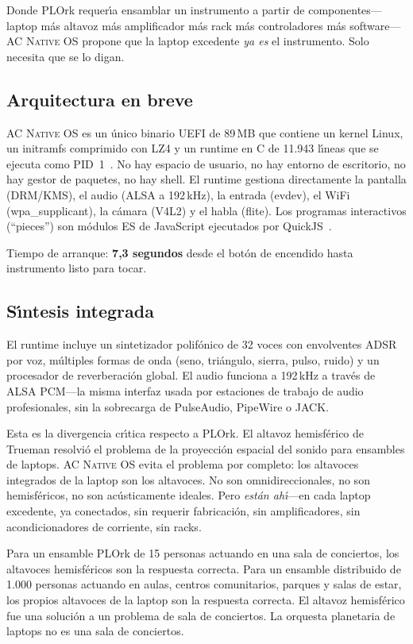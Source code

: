 \documentclass[10pt,letterpaper,twocolumn]{article}
\newcommand{\acos}{\textsc{AC Native OS}}
\begin{document}
Donde PLOrk requer\'{\i}a ensamblar un instrumento a partir de componentes---laptop m\'{a}s altavoz m\'{a}s amplificador m\'{a}s rack m\'{a}s controladores m\'{a}s software---\acos{} propone que la laptop excedente \emph{ya es} el instrumento. Solo necesita que se lo digan.

\subsection{Arquitectura en breve}

\acos{} es un \'{u}nico binario UEFI de 89\,MB que contiene un kernel Linux, un initramfs comprimido con LZ4 y un runtime en C de 11.943 l\'{\i}neas que se ejecuta como PID~1~\citep{scudder2026os}. No hay espacio de usuario, no hay entorno de escritorio, no hay gestor de paquetes, no hay shell. El runtime gestiona directamente la pantalla (DRM/KMS), el audio (ALSA a 192\,kHz), la entrada (evdev), el WiFi (wpa\_supplicant), la c\'{a}mara (V4L2) y el habla (flite). Los programas interactivos (``pieces'') son m\'{o}dulos ES de JavaScript ejecutados por QuickJS~\citep{bellard2019quickjs}.

Tiempo de arranque: \textbf{7,3 segundos} desde el bot\'{o}n de encendido hasta instrumento listo para tocar.

\subsection{S\'{\i}ntesis integrada}

El runtime incluye un sintetizador polif\'{o}nico de 32 voces con envolventes ADSR por voz, m\'{u}ltiples formas de onda (seno, tri\'{a}ngulo, sierra, pulso, ruido) y un procesador de reverberaci\'{o}n global. El audio funciona a 192\,kHz a trav\'{e}s de ALSA PCM---la misma interfaz usada por estaciones de trabajo de audio profesionales, sin la sobrecarga de PulseAudio, PipeWire o JACK.

Esta es la divergencia cr\'{\i}tica respecto a PLOrk. El altavoz hemisf\'{e}rico de Trueman resolvi\'{o} el problema de la proyecci\'{o}n espacial del sonido para ensambles de laptops. \acos{} evita el problema por completo: los altavoces integrados de la laptop son los altavoces. No son omnidireccionales, no son hemisf\'{e}ricos, no son ac\'{u}sticamente ideales. Pero \emph{est\'{a}n ah\'{\i}}---en cada laptop excedente, ya conectados, sin requerir fabricaci\'{o}n, sin amplificadores, sin acondicionadores de corriente, sin racks.

Para un ensamble PLOrk de 15 personas actuando en una sala de conciertos, los altavoces hemisf\'{e}ricos son la respuesta correcta. Para un ensamble distribuido de 1.000 personas actuando en aulas, centros comunitarios, parques y salas de estar, los propios altavoces de la laptop son la respuesta correcta. El altavoz hemisf\'{e}rico fue una soluci\'{o}n a un problema de sala de conciertos. La orquesta planetaria de laptops no es una sala de conciertos.
\end{document}
